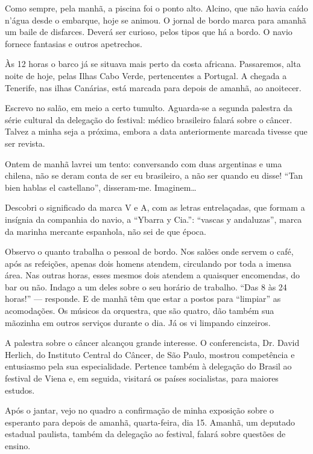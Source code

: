 Como sempre, pela manhã, a piscina foi o ponto alto. Alcino, que não havia caído n’água desde o embarque, hoje se animou. O jornal de bordo marca para amanhã um baile de disfarces. Deverá ser curioso, pelos tipos que há a bordo. O navio fornece fantasias e outros apetrechos.

Às 12 horas o barco já se situava mais perto da costa africana. Passaremos, alta noite de hoje, pelas Ilhas Cabo Verde, pertencentes a Portugal. A chegada a Tenerife, nas ilhas Canárias, está marcada para depois de amanhã, ao anoitecer.

Escrevo no salão, em meio a certo tumulto. Aguarda-se a segunda palestra da série cultural da delegação do festival: médico brasileiro falará sobre o câncer. Talvez a minha seja a próxima, embora a data anteriormente marcada tivesse que ser revista.

Ontem de manhã lavrei um tento: conversando com duas argentinas e uma chilena, não se deram conta de ser eu brasileiro, a não ser quando eu disse! ``Tan bien hablas el castellano'', disseram-me. Imaginem\ldots

Descobri o significado da marca V e A, com as letras entrelaçadas, que formam a insígnia da companhia do navio, a ``Ybarra y Cia.'': ``vascas y andaluzas'', marca da marinha mercante espanhola, não sei de que época.

Observo o quanto trabalha o pessoal de bordo. Nos salões onde servem o café, após as refeições, apenas dois homens atendem, circulando por toda a imensa área. Nas outras horas, esses mesmos dois atendem a quaisquer encomendas, do bar ou não. Indago a um deles sobre o seu horário de trabalho. ``Das 8 às 24 horas!'' --- responde. E de manhã têm que estar a postos para ``limpiar'' as acomodações. Os músicos da orquestra, que são quatro, dão também sua mãozinha em outros serviços durante o dia. Já os vi limpando cinzeiros.

A palestra sobre o câncer alcançou grande interesse. O conferencista, Dr. David Herlich, do Instituto Central do Câncer, de São Paulo, mostrou competência e entusiasmo pela sua especialidade. Pertence também à delegação do Brasil ao festival de Viena e, em seguida, visitará os países socialistas, para maiores estudos.

Após o jantar, vejo no quadro a confirmação de minha exposição sobre o esperanto para depois de amanhã, quarta-feira, dia 15. Amanhã, um deputado estadual paulista, também da delegação ao festival, falará sobre questões de ensino.

